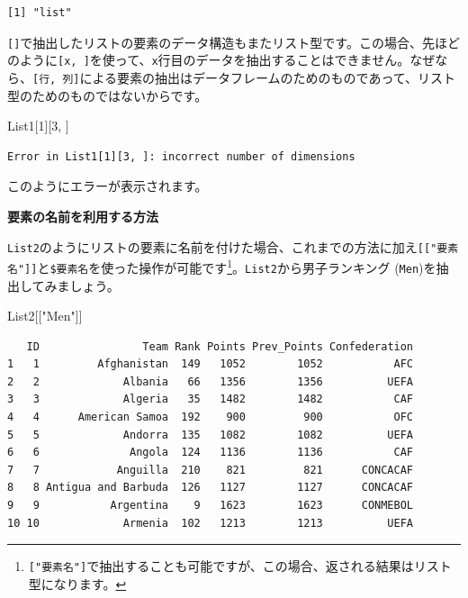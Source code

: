 \documentclass[
  a4paper,
  pandoc,
  ja=standard,
  jafont=haranoaji]{bxjsbook}
\newenvironment{Shaded}{\begin{snugshade}}{\end{snugshade}}
\newcommand{\DecValTok}[1]{\textcolor[rgb]{0.68,0.00,0.00}{#1}}
\newcommand{\NormalTok}[1]{\textcolor[rgb]{0.00,0.48,0.65}{#1}}
\newcommand{\StringTok}[1]{\textcolor[rgb]{0.13,0.47,0.30}{#1}}
\begin{document}
\begin{verbatim}
[1] "list"
\end{verbatim}

\texttt{{[}{]}}で抽出したリストの要素のデータ構造もまたリスト型です。この場合、先ほどのように\texttt{{[}x,\ {]}}を使って、\texttt{x}行目のデータを抽出することはできません。なぜなら、\texttt{{[}行,\ 列{]}}による要素の抽出はデータフレームのためのものであって、リスト型のためのものではないからです。

\begin{Shaded}
\begin{Highlighting}[numbers=left,,]
\NormalTok{List1[}\DecValTok{1}\NormalTok{][}\DecValTok{3}\NormalTok{, ]}
\end{Highlighting}
\end{Shaded}

\begin{verbatim}
Error in List1[1][3, ]: incorrect number of dimensions
\end{verbatim}

このようにエラーが表示されます。

\textbf{要素の名前を利用する方法}

\texttt{List2}のようにリストの要素に名前を付けた場合、これまでの方法に加え\texttt{{[}{[}"要素名"{]}{]}}と\texttt{\$要素名}を使った操作が可能です\footnote{\texttt{{[}"要素名"{]}}で抽出することも可能ですが、この場合、返される結果はリスト型になります。}。\texttt{List2}から男子ランキング
(\texttt{Men})を抽出してみましょう。

\begin{Shaded}
\begin{Highlighting}[numbers=left,,]
\NormalTok{List2[[}\StringTok{"Men"}\NormalTok{]]}
\end{Highlighting}
\end{Shaded}

\begin{verbatim}
   ID                Team Rank Points Prev_Points Confederation
1   1         Afghanistan  149   1052        1052           AFC
2   2             Albania   66   1356        1356          UEFA
3   3             Algeria   35   1482        1482           CAF
4   4      American Samoa  192    900         900           OFC
5   5             Andorra  135   1082        1082          UEFA
6   6              Angola  124   1136        1136           CAF
7   7            Anguilla  210    821         821      CONCACAF
8   8 Antigua and Barbuda  126   1127        1127      CONCACAF
9   9           Argentina    9   1623        1623      CONMEBOL
10 10             Armenia  102   1213        1213          UEFA
\end{verbatim}
\end{document}
